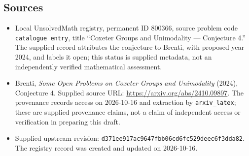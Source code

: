 \documentclass[11pt]{article}
\begin{document}
\subsection{Sources}
\begin{itemize}
\item Local UnsolvedMath registry, permanent ID \(800366\), source problem code \texttt{catalogue entry}, title ``Coxeter Groups and Unimodality --- Conjecture 4.'' The supplied record attributes the conjecture to Brenti, with proposed year 2024, and labels it open; this status is supplied metadata, not an independently verified mathematical assessment.
\item Brenti, \emph{Some Open Problems on Coxeter Groups and Unimodality} (2024), Conjecture 4. Supplied source URL: \url{https://arxiv.org/abs/2410.09897}. The provenance records access on 2026-10-16 and extraction by \texttt{arxiv\_latex}; these are supplied provenance claims, not a claim of independent access or verification in preparing this draft.
\item Supplied upstream revision: \texttt{d371ee917ac9647fbb06cd6fc529deec6f3dda82}. The registry record was created and updated on 2026-10-16.
\end{itemize}
\end{document}
